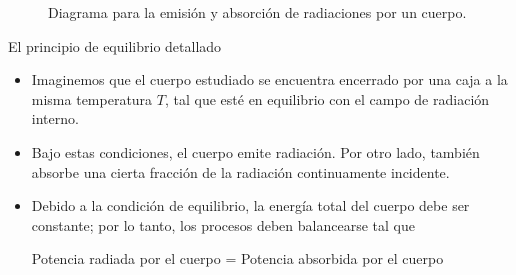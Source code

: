 \documentclass[aspectratio=1610]{beamer}
\begin{document}
\begin{frame}
\begin{figure}
		
		
		\caption{Diagrama para la emisión y absorción de radiaciones por un cuerpo.}
		\label{fig:EmiAbs}
	\end{figure}
\end{frame}

\begin{frame}{El principio de equilibrio detallado}
	\begin{itemize}
		\item Imaginemos que el cuerpo estudiado se encuentra encerrado por una caja a la misma temperatura $T$, tal que esté en equilibrio con el campo de radiación interno.\pause
		\item Bajo estas condiciones, el cuerpo emite radiación. Por otro lado, también absorbe una cierta fracción de la radiación continuamente incidente.\pause
		\item Debido a la condición de equilibrio, la energía total del cuerpo debe ser constante; por lo tanto, los procesos deben balancearse tal que
		\begin{block}{}
			\centering
			Potencia radiada por el cuerpo = Potencia absorbida por el cuerpo
		\end{block}
	\end{itemize}
\end{frame}
\end{document}
